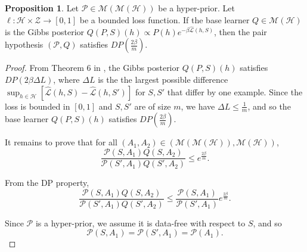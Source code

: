 \documentclass[letterpaper]{article} %
\theoremstyle{definition}
\newtheorem{proposition}[theorem]{Proposition}
\begin{document}
\begin{proposition} \label{thm:pair-is-dp-appendix}
	Let $\mathcal{P}\in \mathcal{M}(\mathcal{M}(\mathcal{H}))$ be a hyper-prior.
	Let $\ell:\mathcal{H}\times \mathcal{Z}\rightarrow [0,1]$ be a bounded loss function. If the base learner $Q\in \mathcal{M}(\mathcal{H})$ is the Gibbs posterior $Q(P, S)(h)\propto P(h)e^{-\beta\hat{\mathcal{L}}(h, S)}$, 
	then the pair hypothesis $(\mathcal{P}, Q)$ satisfies $DP\left (\frac{2\beta}{m}\right )$.
\end{proposition}

\begin{proof}
	From Theorem 6 in \citet{McSherry2007}, the Gibbs posterior $Q(P, S)(h)$ satisfies $DP\left (2\beta\Delta L\right )$, where $\Delta L$ is the the largest possible difference  $\sup_{h\in\mathcal{H}}[\hat{\mathcal{L}}(h,S)-\hat{\mathcal{L}}(h,S')]$ for $S,S'$ that differ by one example. Since the loss is bounded in $[0,1]$ and $S,S'$ are of size $m$, we have $\Delta L\leq \frac{1}{m}$, and so the base learner $Q(P, S)(h)$ satisfies $DP\left (\frac{2\beta}{m}\right )$.
	
	It remains to prove that for all $(A_1,A_2)\in (\mathcal{M}(\mathcal{M}(\mathcal{H})), \mathcal{M}(\mathcal{H}))$, 
	$$ \frac{\mathcal{P}(S, A_1)Q(S,A_2)}{\mathcal{P}(S', A_1)Q(S',A_2)}\leq e^{\frac{2\beta}{m}} .$$
	
	From the DP property, 
%	
	$$ \frac{\mathcal{P}(S, A_1)Q(S,A_2)}{\mathcal{P}(S', A_1)Q(S',A_2)}\leq \frac{\mathcal{P}(S, A_1)}{\mathcal{P}(S', A_1)}e^{\frac{2\beta}{m}} .$$
	
	Since $\mathcal{P}$ is a hyper-prior, we assume it is data-free with respect to $S$, and so 
	$$\mathcal{P}(S, A_1)=\mathcal{P}(S', A_1)=\mathcal{P}(A_1) .$$
	
\end{proof}
\end{document}
